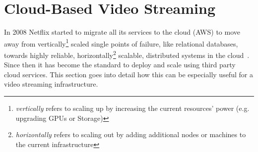     
    
    

\section{Cloud-Based Video Streaming}

In 2008 Netflix started to migrate all its services to the cloud (\ac{AWS}) to move away from vertically\footnote{\textit{vertically} refers to scaling up by increasing the current resources' power (e.g. upgrading GPUs or Storage)} scaled single points of failure, like relational databases, towards highly reliable, horizontally\footnote{\textit{horizontally} refers to scaling out by adding additional nodes or machines to the current infrastructure} scalable, distributed systems in the cloud~\parencite{netflix_aws}. Since then it has become the standard to deploy and scale using third party cloud services. This section goes into detail how this can be especially useful for a video streaming infrastructure. 

